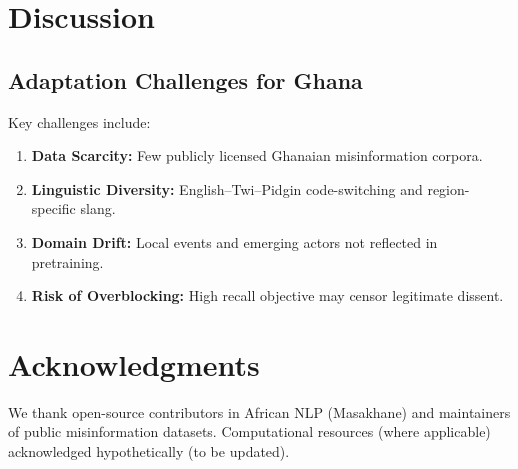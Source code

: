 \documentclass[runningheads]{llncs}
\begin{document}
\section{Discussion}
\subsection{Adaptation Challenges for Ghana} Key challenges include: \begin{enumerate}[nosep] \item \textbf{Data Scarcity:} Few publicly licensed Ghanaian misinformation corpora. \item \textbf{Linguistic Diversity:} English--Twi--Pidgin code-switching and region-specific slang. \item \textbf{Domain Drift:} Local events and emerging actors not reflected in pretraining. \item \textbf{Risk of Overblocking:} High recall objective may censor legitimate dissent. \end{enumerate}

\section*{Acknowledgments}
We thank open-source contributors in African NLP (Masakhane) and maintainers of public misinformation datasets. Computational resources (where applicable) acknowledged hypothetically (to be updated).



\end{document}
